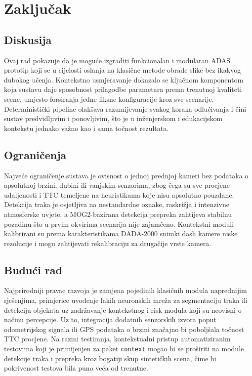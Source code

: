 \chapter{Zaključak}

\section{Diskusija}

Ovaj rad pokazuje da je moguće izgraditi funkcionalan i modularan ADAS prototip koji se u cijelosti oslanja na klasične metode obrade slike bez ikakvog dubokog učenja. Kontekstno usmjeravanje dokazalo se ključnom komponentom koja sustavu daje sposobnost prilagodbe parametara prema trenutnoj kvaliteti scene, umjesto forsiranja jedne fiksne konfiguracije kroz sve scenarije. Deterministički pipeline olakšava razumijevanje svakog koraka odlučivanja i čini sustav predvidljivim i ponovljivim, što je u inženjerskom i edukacijskom kontekstu jednako važno kao i sama točnost rezultata.

\section{Ograničenja}

Najveće ograničenje sustava je ovisnost o jednoj prednjoj kameri bez podataka o apsolutnoj brzini, dubini ili vanjskim senzorima, zbog čega su sve procjene udaljenosti i TTC temeljene na heuristikama koje nisu apsolutno pouzdane. Detekcija traka je osjetljiva na nestandardne oznake, raskrižja i intenzivne atmosferske uvjete, a MOG2-bazirana detekcija prepreka zahtijeva stabilnu pozadinu što u prvim okvirima scenarija nije zajamčeno. Kontekstni moduli kalibrirani su prema karakteristikama DADA-2000 snimki dash kamere niske rezolucije i mogu zahtijevati rekalibraciju za drugačije vrste kamera.

\section{Budući rad}

Najprirodniji pravac razvoja je zamjena pojedinih klasičnih modula naprednijim rješenjima, primjerice uvođenje lakih neuronskih mreža za segmentaciju traka ili detekciju objekata uz zadržavanje kontekstnog i risk modula koji su neovisni o načinu percepcije. Uz to, integracija dodatnih senzorskih izvora poput odometrijskog signala ili GPS podataka o brzini značajno bi poboljšala točnost TTC procjene. Na razini testiranja, kontekstualni pristup automatiziranim testovima koji je primijenjen za paket \texttt{context} mogao bi se proširiti na module detekcije traka i prepreka kroz bogatiji skup sintetičkih scena, čime bi pokrivenost testova bila puno veća od trenutne.